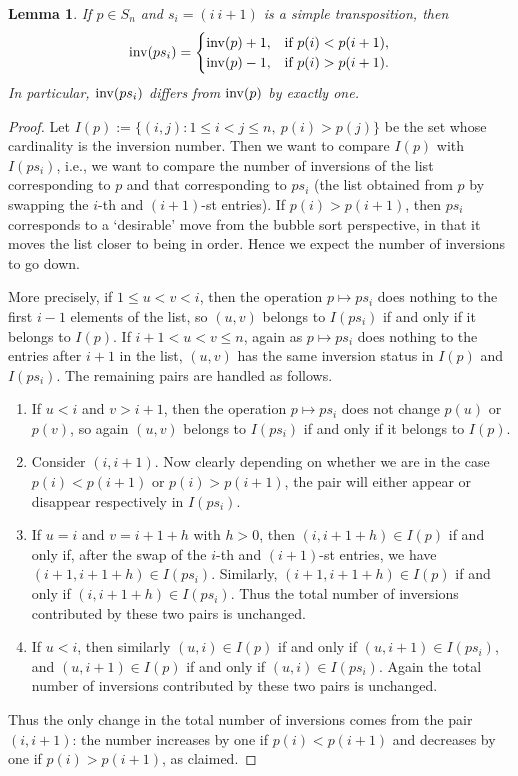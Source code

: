 \documentclass[reqno,11pt]{amsart}
\theoremstyle{definition}
\theoremstyle{plain}
\newtheorem{lemma}{Lemma}[section]
\theoremstyle{remark}
\numberwithin{equation}{section}
\newcommand{\be}{\begin{eqnarray}}
\newcommand{\ee}{\end{eqnarray}}
\begin{document}
\begin{lemma}
If $p\in S_n$ and $s_i=(i\ i+1)$ is a simple transposition, then
\be
\inv(ps_i)=
\begin{cases}
\inv(p)+1, & \text{if }p(i)<p(i+1),\\
\inv(p)-1, & \text{if }p(i)>p(i+1).
\end{cases}
\ee
In particular, $\mathrm{inv}(ps_i)$ differs from $\mathrm{inv}(p)$ by exactly one.
\end{lemma}
\begin{proof} Let $I(p):= \bigl\{(i,j):1\leq i<j\leq n,\ p(i)>p(j)\bigr\}$ be the set whose cardinality is the inversion number. Then we want to compare $I(p)$ with $I(p s_i)$, i.e., we want to compare the number of inversions of the list corresponding to $p$ and that corresponding to $ps_i$ (the list obtained from $p$ by swapping the $i$-th and $(i+1)$-st entries).  If $p(i) > p(i+1)$, then $ps_i$ corresponds to a `desirable' move from the bubble sort perspective, in that it moves the list closer to being in order. Hence we expect the number of inversions to go down. 

More precisely, if $1 \leq u < v < i$, then the operation $p \mapsto ps_i$ does nothing to the first $i-1$ elements of the list, so $(u, v)$ belongs to $I(ps_i)$ if and only if it belongs to $I(p)$. If $i+1 < u < v \leq n$, again as $p \mapsto ps_i$ does nothing to the entries after $i+1$ in the list, $(u, v)$ has the same inversion status in $I(p)$ and $I(p s_i)$. The remaining pairs are handled as follows.

\begin{enumerate}
	\item If $u < i$ and $v > i+1$, then the operation $p \mapsto ps_i$ does not change $p(u)$ or $p(v)$, so again $(u, v)$ belongs to $I(p s_i)$ if and only if it belongs to $I(p)$.
	
	\item Consider $(i, i+1)$. Now clearly depending on whether we are in the case $p(i) < p(i+1)$ or $p(i)> p(i+1)$, the pair will either appear or disappear respectively in $I(ps_i)$.
	
	\item If $u=i$ and $v=i+1+h$ with $h>0$, then $(i, i+1+h) \in I(p)$ if and only if, after the swap of the $i$-th and $(i+1)$-st entries, we have $(i+1, i+1+h) \in I(p s_i)$. Similarly, $(i+1, i+1+h) \in I(p)$ if and only if $(i, i+1+h) \in I(p s_i)$. Thus the total number of inversions contributed by these two pairs is unchanged.
	
	\item If $u<i$, then similarly $(u,i) \in I(p)$ if and only if $(u,i+1) \in I(p s_i)$, and $(u,i+1) \in I(p)$ if and only if $(u,i) \in I(p s_i)$. Again the total number of inversions contributed by these two pairs is unchanged.
\end{enumerate}

Thus the only change in the total number of inversions comes from the pair $(i,i+1)$: the number increases by one if $p(i)<p(i+1)$ and decreases by one if $p(i)>p(i+1)$, as claimed.
\end{proof} 
\end{document}
